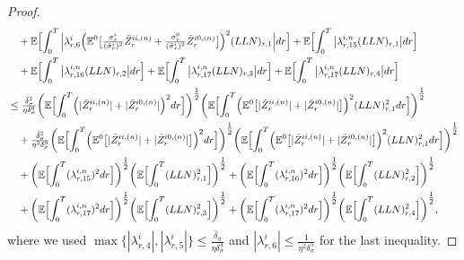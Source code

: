 \documentclass[10pt,a4paper]{amsart}
\begin{document}
\begin{proof}
\begin{align}
&\ \ \ +\mathbb{E}\Bigl[\int_{0}^{T}\Big|\lambda_{r,6}^{i}\Bigl(\mathbb{E}^{0}\bigl[\tfrac{\sigma_{r}^{i}}{(\bar{\sigma}_{r}^{i})^{2}}\bar{Z}_{r}^{ii,(n)}+\tfrac{\sigma_{r}^{0}}{(\bar{\sigma}_{r}^{i})^{2}}\bar{Z}_{r}^{i0,(n)}\bigr]\Bigr)^{2}(LLN)_{r,1}\Big|dr\Bigr] + \mathbb{E}\Bigl[\int_{0}^{T}\big|\lambda_{r,15}^{i,n}(LLN)_{r,1}\big|dr\Bigr] \nonumber \\
&\ \ \ + \mathbb{E}\Bigl[\int_{0}^{T}\big|\lambda_{r,16}^{i,n}(LLN)_{r,2}\big|dr\Bigr] +\mathbb{E}\Bigl[\int_{0}^{T}\big|\lambda_{r,17}^{i,n}(LLN)_{r,3}\big|dr\Bigr] + \mathbb{E}\Bigl[\int_{0}^{T}\big|\lambda_{r,17}^{i,n}(LLN)_{r,4}\big|dr\Bigr] \nonumber \\
&\leq \tfrac{\bar{\delta}_{\sigma}^{2}}{\eta\delta_{\sigma}^{6}}\biggl(\mathbb{E}\Bigl[\int_{0}^{T}\Bigl(|\bar{Z}_{r}^{ii,(n)}| + |\bar{Z}_{r}^{i0,(n)}|\Bigr)^{2}dr\Bigr]\biggr)^{\tfrac{1}{2}}\biggl(\mathbb{E}\Bigl[\int_{0}^{T}\Bigl(\mathbb{E}^{0}\bigl[|\bar{Z}_{r}^{ii,(n)}|+|\bar{Z}_{r}^{i0,(n)}|\bigr]\Bigr)^{2}(LLN)_{r,1}^{2}dr\Bigr]\biggr)^{\tfrac{1}{2}} \nonumber \\
&\ \ \ +\tfrac{\bar{\delta}_{\sigma}^{2}}{\eta^{2}\delta_{\sigma}^{9}}\biggl(\mathbb{E}\Bigl[\int_{0}^{T}\Bigl(\mathbb{E}^{0}\bigl[|\bar{Z}_{r}^{ii,(n)}|+|\bar{Z}_{r}^{i0,(n)}|\bigr]\Bigr)^{2}dr\Bigr]\biggr)^{\tfrac{1}{2}}\biggl(\mathbb{E}\Bigl[\int_{0}^{T}\Bigl(\mathbb{E}^{0}\bigl[|\bar{Z}_{r}^{ii,(n)}|+|\bar{Z}_{r}^{i0,(n)}|\bigr]\Bigr)^{2}(LLN)_{r,1}^{2}dr\Bigr]\biggr)^{\tfrac{1}{2}} \nonumber \\
&\ \ \ +\biggl(\mathbb{E}\Bigl[\int_{0}^{T}(\lambda_{r,15}^{i,n})^{2}dr\Bigr]\biggr)^{\tfrac{1}{2}}\biggl(\mathbb{E}\Bigl[\int_{0}^{T}(LLN)_{r,1}^{2}\Bigr]\biggr)^{\tfrac{1}{2}} + \biggl(\mathbb{E}\Bigl[\int_{0}^{T}(\lambda_{r,16}^{i,n})^{2}dr\Bigr]\biggr)^{\tfrac{1}{2}}\biggl(\mathbb{E}\Bigl[\int_{0}^{T}(LLN)_{r,2}^{2}\Bigr]\biggr)^{\tfrac{1}{2}} \nonumber \\
&\ \ \ + \biggl(\mathbb{E}\Bigl[\int_{0}^{T}(\lambda_{r,17}^{i,n})^{2}dr\Bigr]\biggr)^{\tfrac{1}{2}}\biggl(\mathbb{E}\Bigl[\int_{0}^{T}(LLN)_{r,3}^{2}\Bigr]\biggr)^{\tfrac{1}{2}} + \biggl(\mathbb{E}\Bigl[\int_{0}^{T}(\lambda_{r,17}^{i,n})^{2}dr\Bigr]\biggr)^{\tfrac{1}{2}}\biggl(\mathbb{E}\Bigl[\int_{0}^{T}(LLN)_{r,4}^{2}\Bigr]\biggr)^{\tfrac{1}{2}}, \label{equ:5.13}
\end{align}
where we used $\max\{|\lambda_{r,4}^{i}|,|\lambda_{r,5}^{i}|\} \leq \tfrac{\bar{\delta}_{\sigma}}{\eta\delta_{\sigma}^{4}}$ and $|\lambda_{r,6}^{i}| \leq \tfrac{1}{\eta^{2}\delta_{\sigma}^{5}}$ for the last inequality.

\end{proof}
\end{document}
